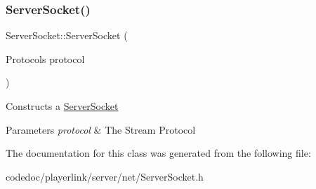 \subsubsection{\texorpdfstring{Server\+Socket()}{ServerSocket()}\hspace{0.1cm}{\footnotesize\ttfamily [2/2]}}
{\footnotesize\ttfamily Server\+Socket\+::\+Server\+Socket (\begin{DoxyParamCaption}\item[{Protocols}]{protocol }\end{DoxyParamCaption})}

Constructs a \hyperlink{classServerSocket}{Server\+Socket} 
\begin{DoxyParams}{Parameters}
{\em protocol} & The Stream Protocol \\
\hline
\end{DoxyParams}


The documentation for this class was generated from the following file\+:\begin{DoxyCompactItemize}
\item 
codedoc/playerlink/server/net/Server\+Socket.\+h\end{DoxyCompactItemize}
